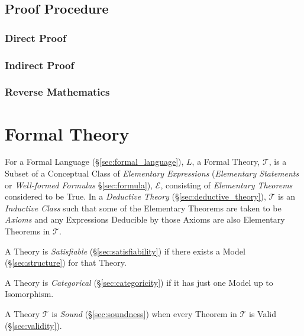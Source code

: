 \subsection{Proof Procedure}\label{sec:proof_procedure}

\subsubsection{Direct Proof}\label{sec:direct_proof}

\subsubsection{Indirect Proof}\label{sec:indirect_proof}

\subsubsection{Reverse Mathematics}\label{sec:reverse_mathematics}



\section{Formal Theory}\label{sec:formal_theory}

For a Formal Language (\S\ref{sec:formal_language}), $L$, a Formal
Theory, $\mathcal{T}$, is a Subset of a Conceptual Class of
\emph{Elementary Expressions} (\emph{Elementary Statements} or
\emph{Well-formed Formulas} \S\ref{sec:formula}), $\mathcal{E}$,
consisting of \emph{Elementary Theorems} considered to be True. In a
\emph{Deductive Theory} (\S\ref{sec:deductive_theory}), $\mathcal{T}$
is an \emph{Inductive Class} such that some of the Elementary Theorems
are taken to be \emph{Axioms} and any Expressions Deducible by those
Axioms are also Elementary Theorems in $\mathcal{T}$.

A Theory is \emph{Satisfiable} (\S\ref{sec:satisfiability}) if there
exists a Model (\S\ref{sec:structure}) for that Theory.

A Theory is \emph{Categorical} (\S\ref{sec:categoricity}) if it has
just one Model up to Isomorphism.

A Theory $\mathcal{T}$ is \emph{Sound} (\S\ref{sec:soundness}) when
every Theorem in $\mathcal{T}$ is Valid (\S\ref{sec:validity}).

